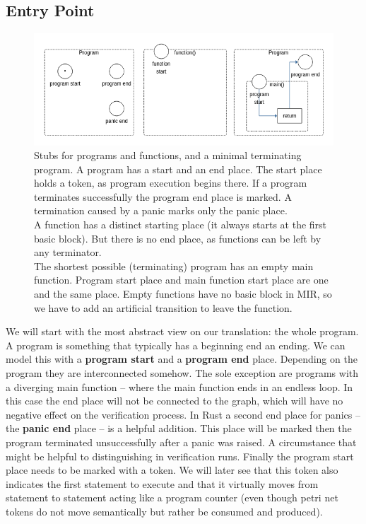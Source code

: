 \subsection{Entry Point}
\begin{figure}
    \centering
    \includegraphics[width=.9\textwidth]{../diagrams/basic_program.png}
    \caption{
        Stubs for programs and functions, and a minimal terminating program.
        A program has a start and an end place.
        The start place holds a token, as program execution begins there.
        If a program terminates successfully the program end place is marked.
        A termination caused by a panic marks only the panic place.\\
        A function has a distinct starting place (it always starts at the first basic block).
        But there is no end place, as functions can be left by any terminator.\\
        The shortest possible (terminating) program has an empty main function.
        Program start place and main function start place are one and the same place.
        Empty functions have no basic block in MIR, so we have to add an artificial transition to leave the function.
    }
    \label{program_blocks_trans}
\end{figure}
We will start with the most abstract view on our translation: the whole program.
A program is something that typically has a beginning end an ending.
We can model this with a \textbf{program start} and a \textbf{program end} place.
Depending on the program they are interconnected somehow.
The sole exception are programs with a diverging main function -- where the main function ends in an endless loop.
In this case the end place will not be connected to the graph, which will have no negative effect on the verification process.
In Rust a second end place for panics -- the \textbf{panic end} place -- is a helpful addition.
This place will be marked then the program terminated unsuccessfully after a panic was raised.
A circumstance that might be helpful to distinguishing in verification runs.
Finally the program start place needs to be marked with a token.
We will later see that this token also indicates the first statement to execute and that it virtually moves from statement to statement acting like a program counter (even though petri net tokens do not move semantically but rather be consumed and produced).

